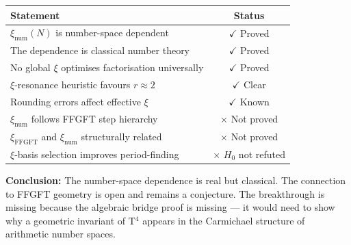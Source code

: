 \begin{center}
\begin{tabular}{lc}
\toprule
Statement & Status \\
\midrule
$\xi_\text{num}(N)$ is number-space dependent & $\checkmark$ Proved \\
The dependence is classical number theory & $\checkmark$ Proved \\
No global $\xi$ optimises factorisation universally & $\checkmark$ Proved \\
$\xi$-resonance heuristic favours $r \approx 2$ & $\checkmark$ Clear \\
Rounding errors affect effective $\xi$ & $\checkmark$ Known \\
$\xi_\text{num}$ follows FFGFT step hierarchy & $\times$ Not proved \\
$\xi_\text{FFGFT}$ and $\xi_\text{num}$ structurally related & $\times$ Not proved \\
$\xi$-basis selection improves period-finding & $\times$ $H_0$ not refuted \\
\bottomrule
\end{tabular}
\end{center}

\begin{mdframed}[style=info]
\textbf{Conclusion:} The number-space dependence is real but classical. The
connection to FFGFT geometry is open and remains a conjecture. The breakthrough
is missing because the algebraic bridge proof is missing — it would need to show
why a geometric invariant of T$^4$ appears in the Carmichael structure of
arithmetic number spaces.
\end{mdframed}
